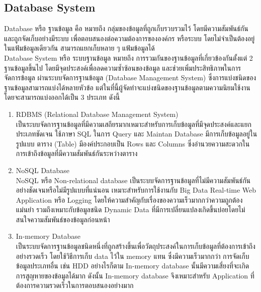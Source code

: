 \documentclass[12pt,oneside,openright,a4paper]{cpe-thai-project}
\begin{document}
\subsection{Database System}
\hspace*{1cm} Database หรือ ฐานข้อมูล \cite{DatabaseDefinition} คือ หมายถึง กลุ่มของข้อมูลที่ถูกเก็บรวบรวมไว้ โดยมีความสัมพันธ์กัน และถูกจัดเก็บอย่างมีระบบ เพื่อตอบสนองต่อความต้องการขององค์กร หรือระบบ โดยไม่จำเป็นต้องอยู่ในแฟ้มข้อมูลเดียวกัน สามารถแยกเก็บหลาย ๆ แฟ้มข้อมูลได้\\
\hspace*{1cm} Database System หรือ ระบบฐานข้อมูล หมายถึง การรวมกันของฐานข้อมูลที่เกี่ยวข้องกันตั้งแต่ 2 ฐานข้อมูลขึ้นไป โดยมีจุดประสงค์เพื่อลดความซ้ำซ้อนของข้อมูล และช่วยเพิ่มประสิทธิภาพในการจัดการข้อมูล ผ่านระบบจัดการฐานข้อมูล (Database Management System) ซึ่งการแบ่งชนิดของฐานข้อมูลสามารถแบ่งได้หลายหัวข้อ แต่ในที่นี้ผู้จัดทำจะแบ่งชนิดของฐานข้อมูลตามความนิยมใช้งาน โดยจะสามารถแบ่งออกได้เป็น 3 ประเภท ดังนี้
\begin{enumerate}
    \item {RDBMS (Relational Database Management System)} \cite{SqlNoSql1} \\
    \hspace*{1cm}เป็นระบบจัดการฐานข้อมูลที่มีความเสถียรมากเหมาะสำหรับการเก็บข้อมูลที่มีจุดประสงค์และแยกประเภทชัดเจน ใช้ภาษา SQL ในการ Query และ Maintan Database มีการเก็บข้อมูลอยู่ในรูปแบบ ตาราง (Table) มีองค์ประกอบเป็น Rows และ Columns ซึ่งอำนวยความสะดวกในการเข้าถึงข้อมูลที่มีความสัมพันธ์กันระหว่างตาราง
    \item {NoSQL Database} \cite{SqlNoSql1, SqlNoSql2} \\
    \hspace*{1cm}NoSQL หรือ Non-relational database เป็นระบบจัดการฐานข้อมูลที่ไม่มีความสัมพันธ์กันอย่างชัดเจนหรือไม่มีรูปแบบที่แน่นอน เหมาะสำหรับการใช้งานกับ Big Data Real-time Web Application หรือ Logging โดยให้ความสำคัญกับเรื่องของความเร็วมากกว่าความถูกต้องแม่นยำ รวมถึงเหมาะกับข้อมูลชนิด Dynamic Data ที่มีการเปลี่ยนแปลงเกิดขึ้นบ่อยโดยไม่สนใจความสัมพันธ์ของข้อมูลก่อนหน้า
    \item {In-memory Database} \cite{InmemoryDatabase} \\
    \hspace*{1cm}เป็นระบบจัดการฐานข้อมูลชนิดหนึ่งที่ถูกสร้างขึ้นเพื่อวัตถุประสงค์ในการเก็บข้อมูลที่ต้องการเข้าถึงอย่างรวดเร็ว โดยใช้วิธีการเก็บ data ไว้ใน memory แทน ซึ่งมีความเร็วมากกว่า การจัดเก็บข้อมูลประเภทอื่น เช่น HDD อย่างไรก็ตาม In-memory database นั้นมีความเสี่ยงที่จะเกิดการสูญหายของข้อมูลได้มาก ดังนั้น In-memory database จึงเหมาะสำหรับ Application ที่ต้องการความรวดเร็วในการตอบสนองอย่างมาก
\end{enumerate}
\end{document}
